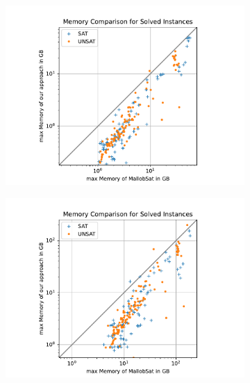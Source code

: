 \documentclass[12pt,a4paper,twoside]{scrartcl}
\numberwithin{equation}{section}
\begin{document}
\begin{figure}[!h]
  \center
  \begin{subfigure}[c]{.45\textwidth}
    \center
    \includegraphics[scale=.45]{plots/square_mem_compare/square_mem_1node.pdf}
    \label{fig:memCompare1node}
  \end{subfigure}
  \begin{subfigure}[c]{.45\textwidth}
    \center
    \includegraphics[scale=.45]{plots/square_mem_compare/square_mem_4node.pdf}
    \label{fig:memCompare4node}
  \end{subfigure}
  \begin{subfigure}[c]{.45\textwidth}
    \center

\end{subfigure}
\end{figure}
\end{document}
